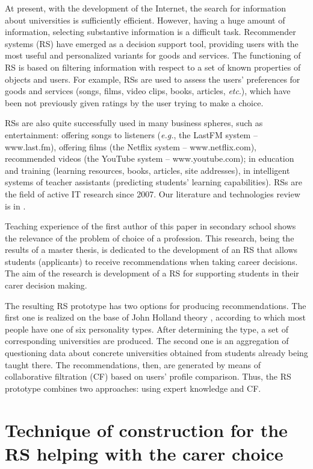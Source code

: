 \documentclass[conference,a4]{IEEEtran}
\begin{document}
At present, with the development of the Internet, the search for information about universities is sufficiently efficient. However, having a huge amount of information, selecting substantive information is a difficult task.  Recommender systems (RS) have emerged as a decision support tool, providing users with the most useful and personalized variants for goods and services.  The functioning of RS is based on filtering information with respect to a set of known properties of objects and users.  For example, RSs are used to assess the users' preferences for goods and services (songs, films, video clips, books, articles, \emph{etc}.), which have been not previously given ratings by the user trying to make a choice.

RSs are also quite successfully used in many business spheres, such as entertainment: offering songs to listeners (\emph{e.g.}, the LastFM system -- www.last.fm), offering films (the Netflix system -- www.netflix.com), recommended videos (the YouTube system -- www.youtube.com); in education and training (learning resources, books, articles, site addresses), in intelligent systems of teacher assistants (predicting students' learning capabilities).  RSs are the field of active IT research since 2007.  Our literature and technologies review is in \cite{review}.

Teaching experience of the first author of this paper in secondary school shows the relevance of the problem of choice of a profession.  This research, being the results of a master thesis, is dedicated to the development of an RS that allows students (applicants) to receive recommendations when taking career decisions.  The aim of the research is development of a RS for supporting students in their carer decision making.

The resulting RS prototype has two options for producing recommendations. The first one is realized on the base of John Holland theory \cite{holland}, according to which most people have one of six personality types.  After determining the type, a set of corresponding universities are produced.  The second one is an aggregation of questioning data about concrete universities obtained from students already being taught there.  The recommendations, then, are generated by means of collaborative filtration (CF) based on users' profile comparison.  Thus, the RS prototype combines two approaches: using expert knowledge and CF.

\section{Technique of construction for the RS helping with the carer choice}
\label{sec:base}
\end{document}
